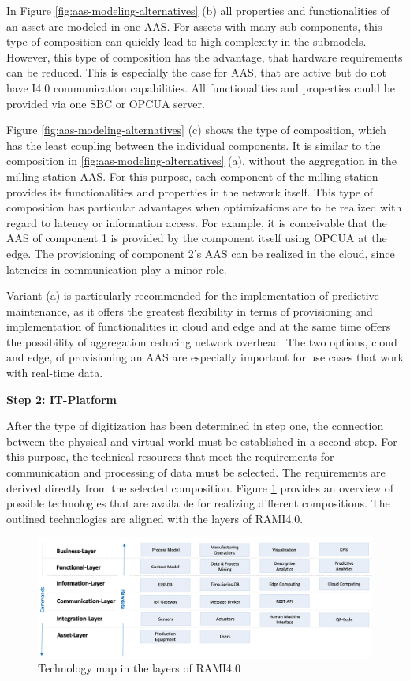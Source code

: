 In Figure \ref{fig:aas-modeling-alternatives} (b) all properties and functionalities of an asset are modeled in one \ac{AAS}. For assets with many sub-components, this type of composition can quickly lead to high complexity in the submodels. However, this type of composition has the advantage, that hardware requirements can be reduced. This is especially the case for \ac{AAS}, that are active but do not have \ac{I4.0} communication capabilities. All functionalities and properties could be provided via one \ac{SBC} or \ac{OPCUA} server.

Figure \ref{fig:aas-modeling-alternatives} (c) shows the type of composition, which has the least coupling between the individual components. It is similar to the composition in \ref{fig:aas-modeling-alternatives} (a), without the aggregation in the milling station \ac{AAS}. For this purpose, each component of the milling station provides its functionalities and properties in the network itself. This type of composition has particular advantages when optimizations are to be realized with regard to latency or information access. For example, it is conceivable that the \ac{AAS} of component 1 is provided by the component itself using \ac{OPCUA} at the edge. The provisioning of component 2's \ac{AAS} can be realized in the cloud, since latencies in communication play a minor role. 

Variant (a) is particularly recommended for the implementation of predictive maintenance, as it offers the greatest flexibility in terms of provisioning and implementation of functionalities in cloud and edge and at the same time offers the possibility of aggregation reducing network overhead. The two options, cloud and edge, of provisioning an \ac{AAS} are especially important for use cases that work with real-time data.

\textbf{Step 2: IT-Platform}

After the type of digitization has been determined in step one, the connection between the physical and virtual world  must be established in a second step. For this purpose, the technical resources that meet the requirements for communication and processing of data must be selected. The requirements are derived directly from the selected composition. Figure \ref{fig:technology-map} provides an overview of possible technologies that are available for realizing different compositions. The outlined technologies are aligned with the layers of \ac{RAMI4.0}.

\begin{figure}[h]
\includegraphics[scale=0.31]{content/pictures/rami_40_tech_mapping.png}
\caption{Technology map in the layers of RAMI4.0}
\label{fig:technology-map}
\end{figure}

